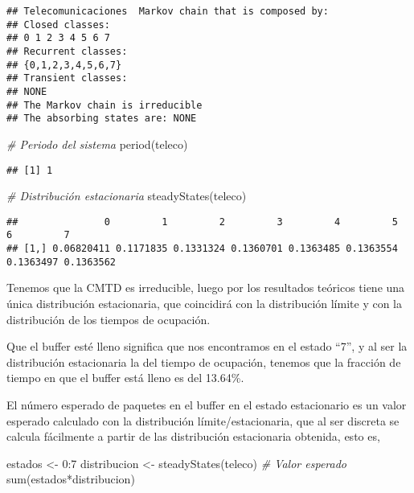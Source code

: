 \documentclass[
]{book}
\newenvironment{Shaded}{\begin{snugshade}}{\end{snugshade}}
\newcommand{\CommentTok}[1]{\textcolor[rgb]{0.56,0.35,0.01}{\textit{#1}}}
\newcommand{\DecValTok}[1]{\textcolor[rgb]{0.00,0.00,0.81}{#1}}
\newcommand{\FunctionTok}[1]{\textcolor[rgb]{0.00,0.00,0.00}{#1}}
\newcommand{\NormalTok}[1]{#1}
\newcommand{\OtherTok}[1]{\textcolor[rgb]{0.56,0.35,0.01}{#1}}
\newcommand{\SpecialCharTok}[1]{\textcolor[rgb]{0.00,0.00,0.00}{#1}}
\theoremstyle{definition}
\theoremstyle{definition}
\theoremstyle{definition}
\theoremstyle{definition}
\theoremstyle{remark}
\begin{document}
\begin{verbatim}
## Telecomunicaciones  Markov chain that is composed by: 
## Closed classes: 
## 0 1 2 3 4 5 6 7 
## Recurrent classes: 
## {0,1,2,3,4,5,6,7}
## Transient classes: 
## NONE 
## The Markov chain is irreducible 
## The absorbing states are: NONE
\end{verbatim}

\begin{Shaded}
\begin{Highlighting}[]
\CommentTok{\# Periodo del sistema}
\FunctionTok{period}\NormalTok{(teleco)}
\end{Highlighting}
\end{Shaded}

\begin{verbatim}
## [1] 1
\end{verbatim}

\begin{Shaded}
\begin{Highlighting}[]
\CommentTok{\# Distribución estacionaria}
\FunctionTok{steadyStates}\NormalTok{(teleco)}
\end{Highlighting}
\end{Shaded}

\begin{verbatim}
##               0         1         2         3         4         5         6         7
## [1,] 0.06820411 0.1171835 0.1331324 0.1360701 0.1363485 0.1363554 0.1363497 0.1363562
\end{verbatim}

Tenemos que la CMTD es irreducible, luego por los resultados teóricos tiene una única distribución estacionaria, que coincidirá con la distribución límite y con la distribución de los tiempos de ocupación.

Que el buffer esté lleno significa que nos encontramos en el estado ``7'', y al ser la distribución estacionaria la del tiempo de ocupación, tenemos que la fracción de tiempo en que el buffer está lleno es del 13.64\%.

El número esperado de paquetes en el buffer en el estado estacionario es un valor esperado calculado con la distribución límite/estacionaria, que al ser discreta se calcula fácilmente a partir de las distribución estacionaria obtenida, esto es,

\begin{Shaded}
\begin{Highlighting}[]
\NormalTok{estados }\OtherTok{\textless{}{-}} \DecValTok{0}\SpecialCharTok{:}\DecValTok{7}
\NormalTok{distribucion }\OtherTok{\textless{}{-}} \FunctionTok{steadyStates}\NormalTok{(teleco)}
\CommentTok{\# Valor esperado}
\FunctionTok{sum}\NormalTok{(estados}\SpecialCharTok{*}\NormalTok{distribucion)}
\end{Highlighting}
\end{Shaded}
\end{document}
